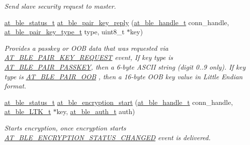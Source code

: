 \begin{DoxyCompactItemize}
\begin{DoxyCompactList}\small\item\em Send slave security request to master. \end{DoxyCompactList}\item 
\mbox{\hyperlink{group__error__codes__group_ga3b1db9b95feb157b3c188ca27fe76988}{at\+\_\+ble\+\_\+status\+\_\+t}} \mbox{\hyperlink{group__gap__sec__group_gad993133993ab7e997935ac4f6537edbe}{at\+\_\+ble\+\_\+pair\+\_\+key\+\_\+reply}} (\mbox{\hyperlink{at__ble__api_8h_abd23646d0c662860741f787efc8456f2}{at\+\_\+ble\+\_\+handle\+\_\+t}} conn\+\_\+handle, \mbox{\hyperlink{at__ble__api_8h_a6b252fad20280faa8087d1a8776c09a0}{at\+\_\+ble\+\_\+pair\+\_\+key\+\_\+type\+\_\+t}} type, uint8\+\_\+t $\ast$key)
\begin{DoxyCompactList}\small\item\em Provides a passkey or O\+OB data that was requested via \mbox{\hyperlink{at__ble__api_8h_a3324640b95f33169515f89738ed5baeba80a994d218165f5cf29199df84a37344}{A\+T\+\_\+\+B\+L\+E\+\_\+\+P\+A\+I\+R\+\_\+\+K\+E\+Y\+\_\+\+R\+E\+Q\+U\+E\+ST}} event, If key type is \mbox{\hyperlink{at__ble__api_8h_a6b252fad20280faa8087d1a8776c09a0ab9a089dad20c1ecb68b97c16556c1f03}{A\+T\+\_\+\+B\+L\+E\+\_\+\+P\+A\+I\+R\+\_\+\+P\+A\+S\+S\+K\+EY}}, then a 6-\/byte A\+S\+C\+II string (digit 0..9 only). If key type is \mbox{\hyperlink{at__ble__api_8h_a6b252fad20280faa8087d1a8776c09a0a08a6e4b72a5e745b4cf2700008908cc7}{A\+T\+\_\+\+B\+L\+E\+\_\+\+P\+A\+I\+R\+\_\+\+O\+OB}} , then a 16-\/byte O\+OB key value in Little Endian format. \end{DoxyCompactList}\item 
\mbox{\hyperlink{group__error__codes__group_ga3b1db9b95feb157b3c188ca27fe76988}{at\+\_\+ble\+\_\+status\+\_\+t}} \mbox{\hyperlink{group__gap__sec__group_ga5342b76c296c45a34e3e33d9181b7734}{at\+\_\+ble\+\_\+encryption\+\_\+start}} (\mbox{\hyperlink{at__ble__api_8h_abd23646d0c662860741f787efc8456f2}{at\+\_\+ble\+\_\+handle\+\_\+t}} conn\+\_\+handle, \mbox{\hyperlink{structat__ble___l_t_k__t}{at\+\_\+ble\+\_\+\+L\+T\+K\+\_\+t}} $\ast$key, \mbox{\hyperlink{at__ble__api_8h_a70253ec09a2361d16e15c37f8cb5b97c}{at\+\_\+ble\+\_\+auth\+\_\+t}} auth)
\begin{DoxyCompactList}\small\item\em Starts encryption, once encryption starts \mbox{\hyperlink{at__ble__api_8h_a3324640b95f33169515f89738ed5baebaac5cdd3deee1c0cb4672efbfb9ebae75}{A\+T\+\_\+\+B\+L\+E\+\_\+\+E\+N\+C\+R\+Y\+P\+T\+I\+O\+N\+\_\+\+S\+T\+A\+T\+U\+S\+\_\+\+C\+H\+A\+N\+G\+ED}} event is delivered. \end{DoxyCompactList}\item 

\end{DoxyCompactItemize}
